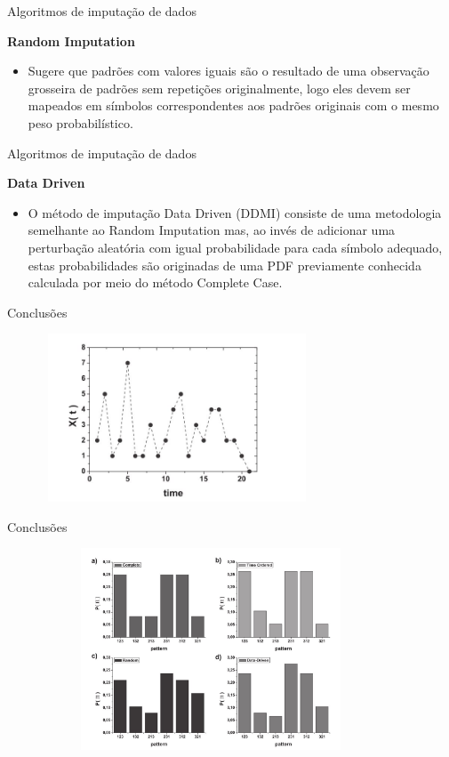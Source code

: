 \documentclass{beamer} %
\begin{document}
\begin{frame}{Algoritmos de imputação de dados}

\textbf{Random Imputation}

\begin{itemize}
    \item Sugere que padrões com valores iguais são o resultado de uma observação grosseira de padrões sem repetições originalmente, logo eles devem ser mapeados em símbolos correspondentes aos padrões originais com o mesmo peso probabilístico.
\end{itemize}


\end{frame}

\begin{frame}{Algoritmos de imputação de dados}

\textbf{Data Driven}

\begin{itemize}
    \item O método de imputação Data Driven (DDMI) consiste de uma metodologia semelhante ao Random Imputation mas, ao invés de adicionar uma perturbação aleatória com igual probabilidade para cada símbolo adequado, estas probabilidades são originadas de uma PDF previamente conhecida calculada por meio do método Complete Case.
\end{itemize}

\end{frame}

\begin{frame}{Conclusões}
    \begin{figure}
      \centering
       \includegraphics[width=8cm,height=5cm]{time.jpeg}
    \end{figure}
\end{frame}

\begin{frame}{Conclusões}
    \begin{figure}
      \centering
       \includegraphics[width=10cm,height=6cm]{histogram.jpeg}
    \end{figure}
\end{frame}
\end{document}
